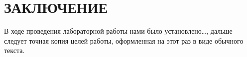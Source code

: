 \section*{ЗАКЛЮЧЕНИЕ}

В ходе проведения лабораторной работы нами было установлено\dots,
дальше следует точная копия целей работы, оформленная на этот раз в 
виде обычного текста.

\newpage

